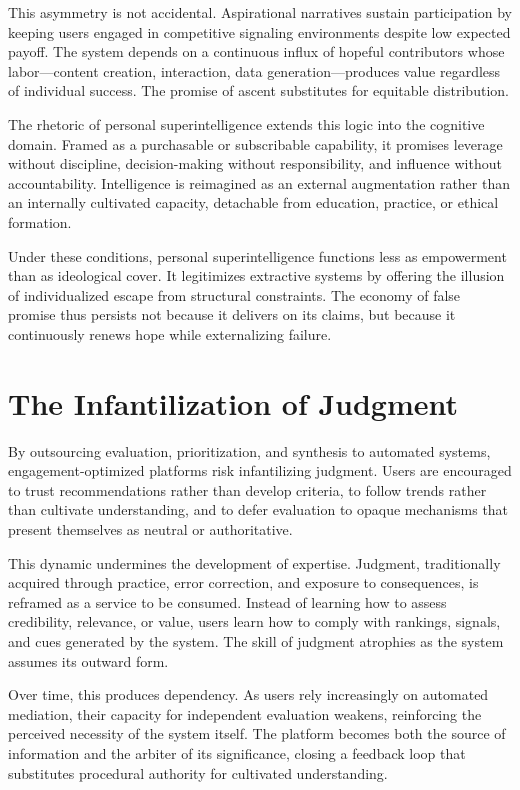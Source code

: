 \documentclass[12pt]{article}
\begin{document}
This asymmetry is not accidental. Aspirational narratives sustain participation by keeping users engaged in competitive signaling environments despite low expected payoff. The system depends on a continuous influx of hopeful contributors whose labor—content creation, interaction, data generation—produces value regardless of individual success. The promise of ascent substitutes for equitable distribution.

The rhetoric of personal superintelligence extends this logic into the cognitive domain. Framed as a purchasable or subscribable capability, it promises leverage without discipline, decision-making without responsibility, and influence without accountability. Intelligence is reimagined as an external augmentation rather than an internally cultivated capacity, detachable from education, practice, or ethical formation.

Under these conditions, personal superintelligence functions less as empowerment than as ideological cover. It legitimizes extractive systems by offering the illusion of individualized escape from structural constraints. The economy of false promise thus persists not because it delivers on its claims, but because it continuously renews hope while externalizing failure.

\section{The Infantilization of Judgment}

By outsourcing evaluation, prioritization, and synthesis to automated systems, engagement-optimized platforms risk infantilizing judgment. Users are encouraged to trust recommendations rather than develop criteria, to follow trends rather than cultivate understanding, and to defer evaluation to opaque mechanisms that present themselves as neutral or authoritative.

This dynamic undermines the development of expertise. Judgment, traditionally acquired through practice, error correction, and exposure to consequences, is reframed as a service to be consumed. Instead of learning how to assess credibility, relevance, or value, users learn how to comply with rankings, signals, and cues generated by the system. The skill of judgment atrophies as the system assumes its outward form.

Over time, this produces dependency. As users rely increasingly on automated mediation, their capacity for independent evaluation weakens, reinforcing the perceived necessity of the system itself. The platform becomes both the source of information and the arbiter of its significance, closing a feedback loop that substitutes procedural authority for cultivated understanding.
\end{document}
